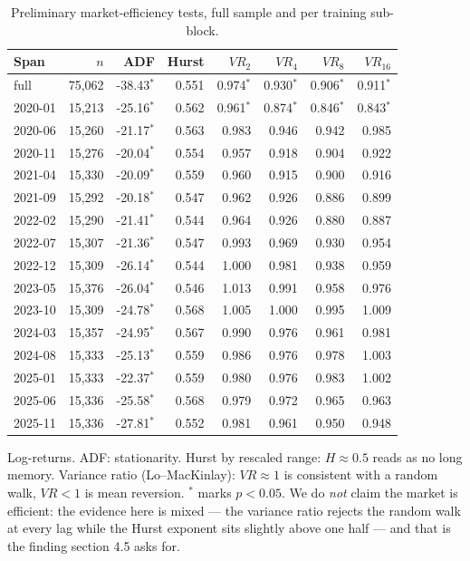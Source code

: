 \begin{table}[!t]
\centering
\caption{Preliminary market-efficiency tests, full sample and per training sub-block.}
\label{tab:efficiency}
\begin{tabular}{lrrrrrrr}
\toprule
Span & $n$ & ADF & Hurst & $VR_2$ & $VR_4$ & $VR_8$ & $VR_{16}$ \\
\midrule
full & 75,062 & -38.43$^{*}$ & 0.551 & 0.974$^{*}$ & 0.930$^{*}$ & 0.906$^{*}$ & 0.911$^{*}$ \\
2020-01 & 15,213 & -25.16$^{*}$ & 0.562 & 0.961$^{*}$ & 0.874$^{*}$ & 0.846$^{*}$ & 0.843$^{*}$ \\
2020-06 & 15,260 & -21.17$^{*}$ & 0.563 & 0.983 & 0.946 & 0.942 & 0.985 \\
2020-11 & 15,276 & -20.04$^{*}$ & 0.554 & 0.957 & 0.918 & 0.904 & 0.922 \\
2021-04 & 15,330 & -20.09$^{*}$ & 0.559 & 0.960 & 0.915 & 0.900 & 0.916 \\
2021-09 & 15,292 & -20.18$^{*}$ & 0.547 & 0.962 & 0.926 & 0.886 & 0.899 \\
2022-02 & 15,290 & -21.41$^{*}$ & 0.544 & 0.964 & 0.926 & 0.880 & 0.887 \\
2022-07 & 15,307 & -21.36$^{*}$ & 0.547 & 0.993 & 0.969 & 0.930 & 0.954 \\
2022-12 & 15,309 & -26.14$^{*}$ & 0.544 & 1.000 & 0.981 & 0.938 & 0.959 \\
2023-05 & 15,376 & -26.04$^{*}$ & 0.546 & 1.013 & 0.991 & 0.958 & 0.976 \\
2023-10 & 15,309 & -24.78$^{*}$ & 0.568 & 1.005 & 1.000 & 0.995 & 1.009 \\
2024-03 & 15,357 & -24.95$^{*}$ & 0.567 & 0.990 & 0.976 & 0.961 & 0.981 \\
2024-08 & 15,333 & -25.13$^{*}$ & 0.559 & 0.986 & 0.976 & 0.978 & 1.003 \\
2025-01 & 15,333 & -22.37$^{*}$ & 0.559 & 0.980 & 0.976 & 0.983 & 1.002 \\
2025-06 & 15,336 & -25.58$^{*}$ & 0.568 & 0.979 & 0.972 & 0.965 & 0.963 \\
2025-11 & 15,336 & -27.81$^{*}$ & 0.552 & 0.981 & 0.961 & 0.950 & 0.948 \\
\bottomrule
\end{tabular}
\vspace{2pt}\par\footnotesize Log-returns. ADF: stationarity. Hurst by rescaled range: $H\approx0.5$ reads as no long memory. Variance ratio (Lo--MacKinlay): $VR\approx1$ is consistent with a random walk, $VR<1$ is mean reversion. $^{*}$ marks $p<0.05$. We do \emph{not} claim the market is efficient: the evidence here is mixed --- the variance ratio rejects the random walk at every lag while the Hurst exponent sits slightly above one half --- and that is the finding section 4.5 asks for.
\end{table}
